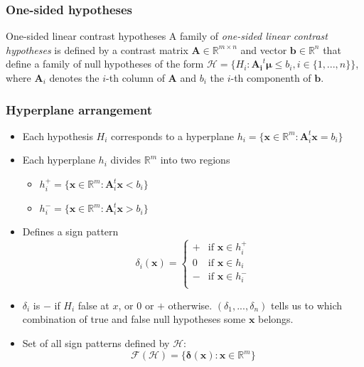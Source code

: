 \documentclass[bigger]{beamer}
\newcommand{\bs}[1]{\bm{#1}}
\newcommand{\R}{\mathbb{R}}
\begin{document}
\begin{frame}
 \frametitle{One-sided hypotheses}
 \begin{block}{One-sided linear contrast hypotheses}
   A family of {\em one-sided linear contrast hypotheses} is defined
   by a contrast matrix $\bs{A} \in \mathbb{R}^{m\times n}$ and
   vector $\bs{b} \in \mathbb{R}^n$ that define a  family of null
   hypotheses of the form $\mathscr{H} = \{H_i: \bs{A_i}^t\bs{\mu}
   \leq b_i,i \in \{1,...,n\}\}$, where $\bs{A}_i$ denotes the $i$-th
   column of $\bs{A}$ and $b_i$ the $i$-th componenth of $\bs{b}$.
 \end{block}
\end{frame}

\begin{frame}
 \frametitle{Hyperplane arrangement}
 \begin{itemize}
 \item Each hypothesis $H_i$ corresponds to a hyperplane $h_i =
   \{\bs{x} \in \mathbb{R}^m: \bs{A}_i^t\bs{x} = b_i\}$
 \item Each hyperplane $h_i$ divides $\mathbb{R}^m$ into two regions
   \begin{itemize}
   \item $h_i^+ = \{\bs{x} \in \mathbb{R}^m: \bs{A}_i^t\bs{x} <
     b_i\}$
   \item $h_i^- = \{\bs{x} \in \mathbb{R}^m: \bs{A}_i^t\bs{x}
     > b_i\}$
   \end{itemize}
 \item Defines a sign pattern
   \begin{equation}
     \label{eq:sign}
     \delta_i(\bs{x}) = \left\{
       \begin{array}{ll}
         + & \text{if } \bs{x} \in h_i^+\\
         0 & \text{if } \bs{x} \in h_i \\
         - & \text{if } \bs{x} \in h_i^-\\
       \end{array}\right.
   \end{equation}
 \item $\delta_i$ is $-$ if $H_i$ false at $x$, or $0$ or $+$
   otherwise. $(\delta_1,...,\delta_n)$ tells us to which combination
   of true and false null hypotheses some $\bs{x}$ belongs.

 \item Set of all sign patterns defined by $\mathscr{H}$:
   \begin{equation}
     \label{eq:faces}
     \mathcal{F}(\mathscr{H}) = \{\bs{\delta}(\bs{x}): \bs{x} \in \R^m\}
   \end{equation}
 \end{itemize}
\end{frame}
\end{document}
